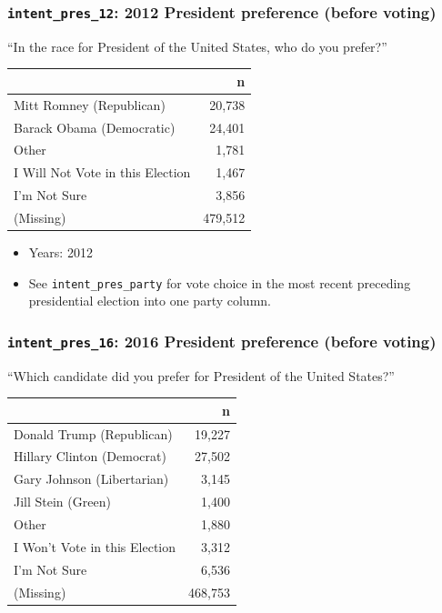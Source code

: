 \documentclass[10pt,article,oneside]{memoir}
\theoremstyle{definition}
\begin{document}
\hypertarget{intent_pres_12-2012-president-preference-before-voting}{%
\subsubsection{\texorpdfstring{\texttt{intent\_pres\_12}: 2012 President
preference (before
voting)}{intent\_pres\_12: 2012 President preference (before voting)}}\label{intent_pres_12-2012-president-preference-before-voting}}

``In the race for President of the United States, who do you prefer?''

\begin{table}[H]
\centering
\begin{tabular}{lr}
\toprule
 & n\\
\midrule
Mitt Romney (Republican) & 20,738\\
Barack Obama (Democratic) & 24,401\\
Other & 1,781\\
I Will Not Vote in this Election & 1,467\\
I'm Not Sure & 3,856\\
(Missing) & 479,512\\
\bottomrule
\end{tabular}
\end{table}

\begin{itemize}
\tightlist
\item
  Years: 2012
\item
  See \texttt{intent\_pres\_party} for vote choice in the most recent
  preceding presidential election into one party column.
\end{itemize}

\hypertarget{intent_pres_16-2016-president-preference-before-voting}{%
\subsubsection{\texorpdfstring{\texttt{intent\_pres\_16}: 2016 President
preference (before
voting)}{intent\_pres\_16: 2016 President preference (before voting)}}\label{intent_pres_16-2016-president-preference-before-voting}}

``Which candidate did you prefer for President of the United States?''

\begin{table}[H]
\centering
\begin{tabular}{lr}
\toprule
 & n\\
\midrule
Donald Trump (Republican) & 19,227\\
Hillary Clinton (Democrat) & 27,502\\
Gary Johnson (Libertarian) & 3,145\\
Jill Stein (Green) & 1,400\\
Other & 1,880\\
I Won't Vote in this Election & 3,312\\
I'm Not Sure & 6,536\\
(Missing) & 468,753\\
\bottomrule
\end{tabular}
\end{table}
\end{document}
